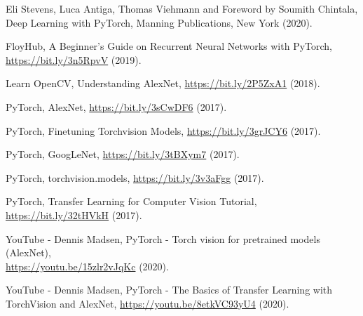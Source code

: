 \documentclass[a4paper]{article}
\begin{document}
\clearpage

\begin{thebibliography}{80}

     Eli Stevens, Luca Antiga, Thomas Viehmann and Foreword by Soumith Chintala, Deep Learning with PyTorch, Manning Publications, New York (2020).

     FloyHub, A Beginner’s Guide on Recurrent Neural Networks with PyTorch, \href{https://bit.ly/3n5RpvV}{https://bit.ly/3n5RpvV} (2019).
    
     Learn OpenCV, Understanding AlexNet, \href{https://bit.ly/2P5ZxA1}{https://bit.ly/2P5ZxA1} (2018).

     PyTorch, AlexNet, \href{https://bit.ly/3sCwDF6}{https://bit.ly/3sCwDF6} (2017).
    
     PyTorch, Finetuning Torchvision Models, \href{https://bit.ly/3grJCY6}{https://bit.ly/3grJCY6} (2017).
    
     PyTorch, GoogLeNet, \href{https://bit.ly/3tBXym7}{https://bit.ly/3tBXym7} (2017).
    
     PyTorch, torchvision.models, \href{https://bit.ly/3v3aFgg}{https://bit.ly/3v3aFgg} (2017).
    
     PyTorch, Transfer Learning for Computer Vision Tutorial, \href{https://bit.ly/32tHVkH}{https://bit.ly/32tHVkH} (2017).
    
     YouTube - Dennis Madsen, PyTorch - Torch vision for pretrained models (AlexNet),\\\href{https://youtu.be/15zlr2vJqKc}{https://youtu.be/15zlr2vJqKc} (2020).
    
     YouTube - Dennis Madsen, PyTorch - The Basics of Transfer Learning with TorchVision and AlexNet, \href{https://youtu.be/8etkVC93yU4}{https://youtu.be/8etkVC93yU4} (2020).
\end{thebibliography}
\end{document}
